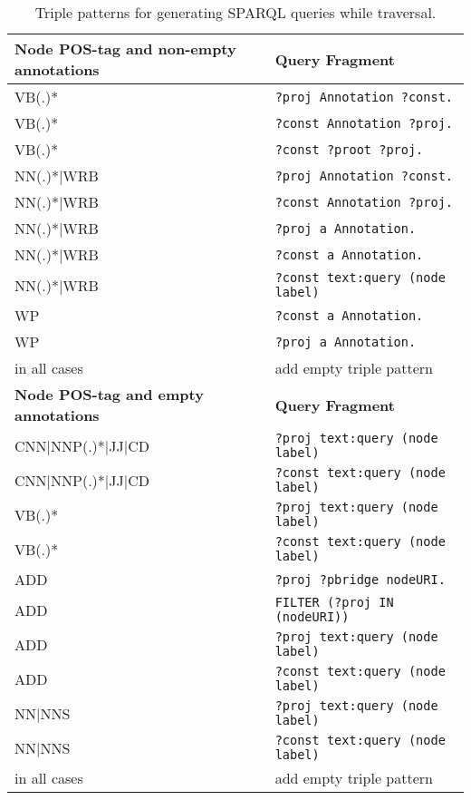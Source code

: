 \begin{table}[htb!]
\centering
\caption{Triple patterns for generating SPARQL queries while traversal.}
\begin{tabular}{ll}
\toprule
\textbf{Node POS-tag and non-empty annotations} & \textbf{Query Fragment} \\
\midrule
VB(.)* & \texttt{?proj Annotation ?const.} \\
VB(.)* & \texttt{?const Annotation ?proj.} \\
VB(.)* & \texttt{?const ?proot ?proj.} \\
NN(.)*$|$WRB & \texttt{?proj  Annotation ?const.} \\
NN(.)*$|$WRB & \texttt{?const Annotation ?proj.} \\
NN(.)*$|$WRB & \texttt{?proj a Annotation.} \\
NN(.)*$|$WRB & \texttt{?const a Annotation.} \\
NN(.)*$|$WRB & \texttt{?const text:query (node label)} \\
WP& \texttt{?const a Annotation.} \\
WP& \texttt{?proj a Annotation.} \\
in all cases & add empty triple pattern\\
\midrule
\textbf{Node POS-tag and empty annotations} & \textbf{Query Fragment} \\
\midrule
CNN$|$NNP(.)*$|$JJ$|$CD&  \texttt{?proj text:query (node label)} \\
CNN$|$NNP(.)*$|$JJ$|$CD&\texttt{?const text:query (node label)} \\
VB(.)*& \texttt{?proj text:query (node label)} \\
VB(.)*&\texttt{?const text:query (node label)} \\
ADD& \texttt{?proj ?pbridge nodeURI.} \\
ADD& \texttt{FILTER (?proj IN (nodeURI))} \\
ADD&  \texttt{?proj text:query (node label)} \\
ADD& \texttt{?const text:query (node label)} \\
NN$|$NNS& \texttt{?proj text:query (node label)} \\
NN$|$NNS& \texttt{?const text:query (node label)} \\
in all cases & add empty triple pattern \\
\bottomrule
\end{tabular}

\label{tab:triple_patterns}
\end{table}